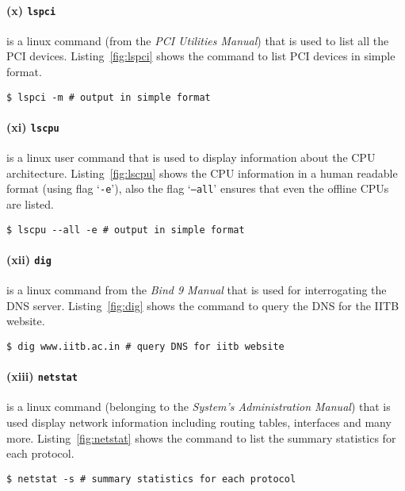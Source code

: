 \documentclass[final,5p,times,authoryear]{elsarticle}
\begin{document}
% 
% 
\paragraph{(x) {\tt lspci}}
is a linux command (from the {\it PCI Utilities Manual}) that is used to list all the PCI devices. Listing~\ref{fig:lspci} shows the command to list PCI devices in simple format.
\begin{lstlisting}[captionpos=b, caption={Code snippet showing the use of {\tt lspci} command to list the PCI devices in a simple format.},label={fig:lspci},style=codeBash]
$ lspci -m # output in simple format
\end{lstlisting}

% 
% 
\paragraph{(xi) {\tt lscpu}}
is a linux user command that is used to display information about the CPU architecture. Listing~\ref{fig:lscpu} shows the CPU information in a human readable format (using flag `{\tt -e}'), also the flag `{\tt --all}' ensures that even the offline CPUs are listed.
\begin{lstlisting}[captionpos=b, caption={Code snippet showing the use of {\tt lscpu} command to display CPU architecture information in a human readable format.},label={fig:lscpu},style=codeBash]
$ lscpu --all -e # output in simple format
\end{lstlisting}

% 
% 
\paragraph{(xii) {\tt dig}}
is a linux command from the {\it Bind 9 Manual} that is used for interrogating the DNS server. Listing~\ref{fig:dig} shows the command to query the DNS for the IITB website.
\begin{lstlisting}[captionpos=b, caption={Code snippet showing the use of {\tt dig} command to query DNS server for the IITB website.},label={fig:dig},style=codeBash]
$ dig www.iitb.ac.in # query DNS for iitb website
\end{lstlisting}

% 
% 
\paragraph{(xiii) {\tt netstat}}
is a linux command (belonging to the {\it System's Administration Manual}) that is used display network information including routing tables, interfaces and many more. Listing~\ref{fig:netstat} shows the command to list the summary statistics for each protocol.
\begin{lstlisting}[captionpos=b, caption={Code snippet showing the use of {\tt netstat} command to display summart status for each protocol.},label={fig:netstat},style=codeBash]
$ netstat -s # summary statistics for each protocol
\end{lstlisting}
\end{document}
